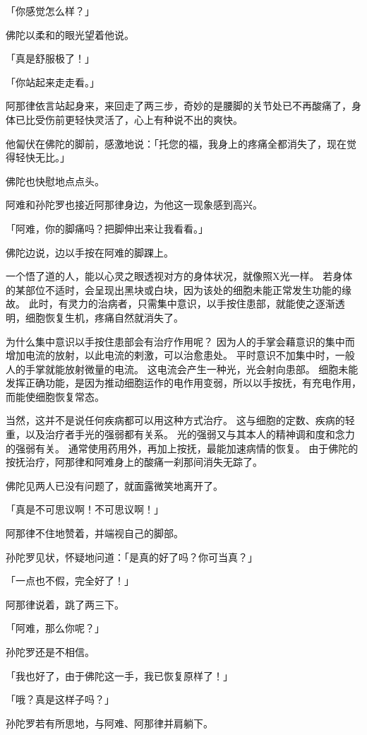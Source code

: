 \documentclass[twoside,openany]{book}
\begin{document}
「你感觉怎么样？」

佛陀以柔和的眼光望着他说。

「真是舒服极了！」

「你站起来走走看。」

阿那律依言站起身来，来回走了两三步，奇妙的是腰脚的关节处已不再酸痛了，身体已比受伤前更轻快灵活了，心上有种说不出的爽快。

他匐伏在佛陀的脚前，感激地说：「托您的福，我身上的疼痛全都消失了，现在觉得轻快无比。」

佛陀也快慰地点点头。

阿难和孙陀罗也接近阿那律身边，为他这一现象感到高兴。

「阿难，你的脚痛吗？把脚伸出来让我看看。」

佛陀边说，边以手按在阿难的脚踝上。

一个悟了道的人，能以心灵之眼透视对方的身体状况，就像照X光一样。
若身体的某部位不适时，会呈现出黑块或白块，因为该处的细胞未能正常发生功能的缘故。
此时，有灵力的治病者，只需集中意识，以手按住患部，就能使之逐渐透明，细胞恢复生机，疼痛自然就消失了。

为什么集中意识以手按住患部会有治疗作用呢？
因为人的手掌会藉意识的集中而增加电流的放射，以此电流的剌激，可以治愈患处。
平时意识不加集中时，一般人的手掌就能放射微量的电流。
这电流会产生一种光，光会射向患部。
细胞未能发挥正确功能，是因为推动细胞运作的电作用变弱，所以以手按抚，有充电作用，而能使细胞恢复常态。

当然，这并不是说任何疾病都可以用这种方式治疗。
这与细胞的定数、疾病的轻重，以及治疗者手光的强弱都有关系。
光的强弱又与其本人的精神调和度和念力的强弱有关。
通常使用药用外，再加上按抚，最能加速病情的恢复。
由于佛陀的按抚治疗，阿那律和阿难身上的酸痛一刹那间消失无踪了。

佛陀见两人已没有问题了，就面露微笑地离开了。

「真是不可思议啊！不可思议啊！」

阿那律不住地赞着，并端视自己的脚部。

孙陀罗见状，怀疑地问道：「是真的好了吗？你可当真？」

「一点也不假，完全好了！」

阿那律说着，跳了两三下。

「阿难，那么你呢？」

孙陀罗还是不相信。

「我也好了，由于佛陀这一手，我已恢复原样了！」

「哦？真是这样子吗？」

孙陀罗若有所思地，与阿难、阿那律并肩躺下。
\end{document}
